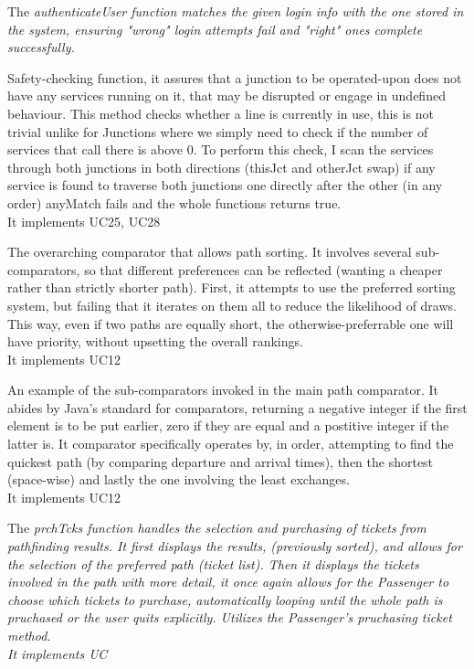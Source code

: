 The \it{authenticateUser} function matches the given login info with the one stored in the system, ensuring "wrong" login attempts fail and "right" ones complete successfully.

Safety-checking function, it assures that a junction to be operated-upon does not have any services running on it, that may be disrupted or engage in undefined behaviour.
This method checks whether a line is currently in use, this is not trivial unlike for Junctions where we simply need to check if the number of services that call there is above 0. To perform this check, I scan the services through both junctions in both directions (thisJct and otherJct swap) if any service is found to traverse both junctions one directly after the other (in any order) anyMatch fails and the whole functions returns true.\\
It implements UC25, UC28

The overarching comparator that allows path sorting. It involves several sub-comparators, so that different preferences can be reflected (wanting a cheaper rather than strictly shorter path).
First, it attempts to use the preferred sorting system, but failing that it iterates on them all to reduce the likelihood of draws. This way, even if two paths are equally short, the otherwise-preferrable one will have priority, without upsetting the overall rankings.\\
It implements UC12

An example of the sub-comparators invoked in the main path comparator. It abides by Java's standard for comparators, returning a negative integer if the first element is to be put earlier, zero if they are equal and a postitive integer if the latter is.
It comparator specifically operates by, in order, attempting to find the quickest path (by comparing departure and arrival times), then the shortest (space-wise) and lastly the one involving the least exchanges.\\
It implements UC12

The \it{prchTcks} function handles the selection and purchasing of tickets from pathfinding results. It first displays the results, (previously sorted), and allows for the selection of the preferred path (ticket list).
Then it displays the tickets involved in the path with more detail, it once again allows for the Passenger to choose which tickets to purchase, automatically looping until the whole path is pruchased or the user quits explicitly.
Utilizes the Passenger's pruchasing ticket method.\\
It implements UC

